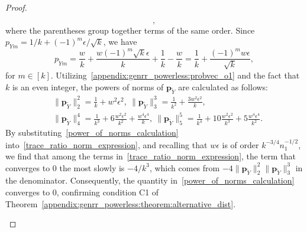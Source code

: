 \documentclass[twoside,11pt]{article}
\newcommand{\rvTwo}{Y}
\newcommand{\alphabetSize}{k} %
\newcommand{\vectorIndex}{m}
\newcommand{\sampleSize}{n}
\newcommand{\probVecElement}[2]{p_{{#1}{#2}}}
\newcommand{\probVec}{\mathbf{p}} %
\begin{document}
\begin{appendix}
\begin{proof}
\begin{itemize}
\begin{itemize}
\begin{equation}
{				},
			\end{equation}
			where the parentheses group together terms of the same order.
			\noindent
			Since 
			$\probVecElement{\rvTwo}{\vectorIndex}
			=
			1/\alphabetSize
			+
			(-1)^\vectorIndex
			\epsilon
			/
			\sqrt{\alphabetSize}$, we have
			\begin{equation}\label{appendix:genrr_powerless:probvec_o1}
				\probVecElement{\tilde{\rvTwo}}{\vectorIndex}
				=
				\frac{w}{\alphabetSize}
				+
				\frac{
					w
					(-1)^\vectorIndex
					\sqrt{k}\epsilon }{\alphabetSize}
				+
				\frac{1}{\alphabetSize}
				-
				\frac{w}{\alphabetSize}
				=
				\frac{1}{\alphabetSize}
				+
				\frac{(-1)^m w \epsilon}{
					\sqrt{\alphabetSize}
				},
			\end{equation}
			for $\vectorIndex \in [\alphabetSize]$.
			Utilizing~\eqref{appendix:genrr_powerless:probvec_o1} and the fact that $\alphabetSize$ is an even integer, the powers of norms of $\probVec_{\tilde{\rvTwo}}$ are calculated
			as follows:
			\begin{equation} \label{power_of_norms_calculation}
				\begin{aligned}
					& \|\probVec_{\tilde{\rvTwo}}\|_2^2
					=
					\frac{1}{\alphabetSize} + w^2 \epsilon^2
					, \ 
					\|\probVec_{\tilde{\rvTwo}}\|_3^3
					=
					\frac{1}{\alphabetSize^2}
					+
					\frac{3w^2 \epsilon^2}{\alphabetSize}
					, \\
					& \|\probVec_{\tilde{\rvTwo}}\|_4^4 = \frac{1}{\alphabetSize^3}
					+
					6
					\frac{w^2 \epsilon^2}{\alphabetSize^2}
					+
					\frac{w^4 \epsilon^4}{\alphabetSize}, \
					\|\probVec_{\tilde{\rvTwo}}\|_5^5 = \frac{1}{\alphabetSize^4}
					+
					10
					\frac{w^2 \epsilon^2}{\alphabetSize^3}
					+
					5
					\frac{w^4 \epsilon^4}{\alphabetSize^2}.
				\end{aligned}
			\end{equation}
			By substituting~\eqref{power_of_norms_calculation} into~\eqref{trace_ratio_norm_expression}, 
			and recalling that $w\epsilon$ is of order $\alphabetSize^{-3/4}\sampleSize_1^{-1/2}$,
			we find that among the terms  in~\eqref{trace_ratio_norm_expression}, the term that converges to 0 the most slowly is $-4/k^3$,
			which comes from $-
			4
			\|\probVec_{\tilde{\rvTwo}}\|_2^2
			\|\probVec_{\tilde{\rvTwo}}\|_3^3$
			in the denominator. Consequently, the quantity in~\eqref{power_of_norms_calculation} converges to 0, confirming condition C1 of Theorem~\ref{appendix:genrr_powerless:theorem:alternative_dist}.

\end{itemize}
\end{itemize}
\end{proof}
\end{appendix}
\end{document}
